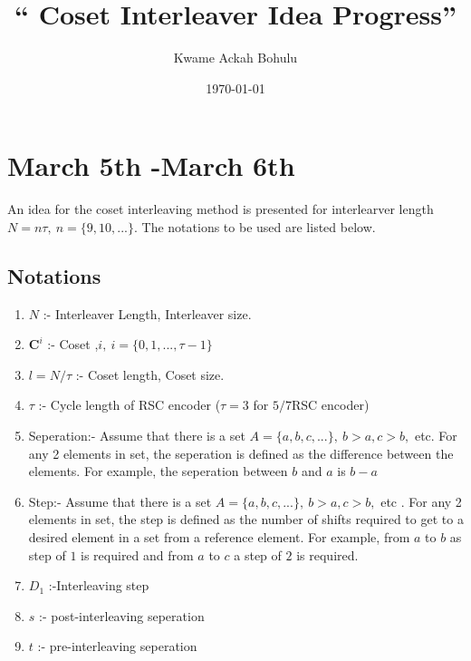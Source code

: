 \documentclass[11pt, oneside, dvipdfmx]{book}
\title{``
Coset Interleaver Idea Progress'' }
\author{Kwame Ackah Bohulu}
\date{\today}
\begin{document}
\maketitle




\section{March 5th -March 6th}
An idea for the coset interleaving method is presented for interlearver length $N=n\tau,~n=\{9,10,...\}$. 
The notations to be used are listed below.

 \subsection{Notations}
 \begin{enumerate}
 \item $N$ :- Interleaver Length, Interleaver size.
  \item $\mathbf{C}^i$ :- Coset ,$i,~i=\{0,1,...,\tau-1 \}$
 \item $l=N/\tau$ :- Coset length, Coset size.
 \item $\tau$ :- Cycle length of RSC encoder ($\tau= 3$ for $5/7$RSC encoder)
 
 \item Seperation:- Assume that there is a set $A=\{a,b,c,...\},~b>a,c>b,$ etc. For any 2 elements in set, the seperation is defined as the difference between the elements. For example, the seperation between $b$ and $a$ is $b-a$
 \item Step:- Assume that there is a set $A=\{a,b,c,...\},~b>a,c>b,$ etc . For any 2 elements in set, the step is defined as the number of shifts required to get to a desired element in a set from a reference element. For example, from $a$ to $b$ as step of $1$ is required and from $a$ to $c$ a step of $2$ is required.
 \item $D_1$ :-Interleaving step
 \item $s$ :- post-interleaving seperation
 \item $t$ :- pre-interleaving seperation

 \end{enumerate}
 
\end{document}
